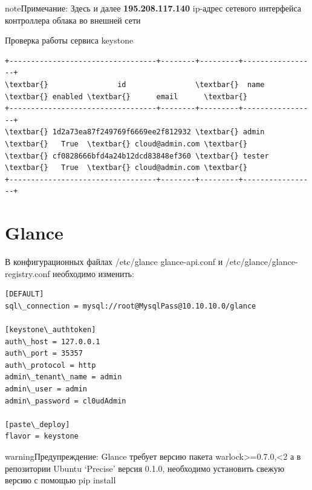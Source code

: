 \documentclass[letterpaper,10pt,russian]{sphinxmanual}
\begin{document}
\begin{notice}{note}{Примечание:}
Здесь и далее \textbf{195.208.117.140} ip-адрес сетевого интерфейса контроллера облака во внешней сети
\end{notice}

Проверка работы сервиса keystone


\begin{Verbatim}[commandchars=\\\{\}]
+----------------------------------+--------+---------+-----------------+
\textbar{}                id                \textbar{}  name  \textbar{} enabled \textbar{}      email      \textbar{}
+----------------------------------+--------+---------+-----------------+
\textbar{} 1d2a73ea87f249769f6669ee2f812932 \textbar{} admin  \textbar{}   True  \textbar{} cloud@admin.com \textbar{}
\textbar{} cf0828666bfd4a24b12dcd83848ef360 \textbar{} tester \textbar{}   True  \textbar{} cloud@admin.com \textbar{}
+----------------------------------+--------+---------+-----------------+
\end{Verbatim}


\section{Glance}
\label{index:glance}


В конфигурационных файлах /etc/glance glance-api.conf и /etc/glance/glance-registry.conf необходимо изменить:

\begin{Verbatim}[commandchars=\\\{\}]
[DEFAULT]
sql\_connection = mysql://root@MysqlPass@10.10.10.0/glance

[keystone\_authtoken]
auth\_host = 127.0.0.1
auth\_port = 35357
auth\_protocol = http
admin\_tenant\_name = admin
admin\_user = admin
admin\_password = cl0udAdmin

[paste\_deploy]
flavor = keystone
\end{Verbatim}




\begin{notice}{warning}{Предупреждение:}
Glance требует версию пакета warlock\textgreater{}=0.7.0,\textless{}2 а в репозитории Ubuntu `Precise' версия 0.1.0, необходимо установить свежую версию с помощью pip install
\end{notice}
\end{document}
